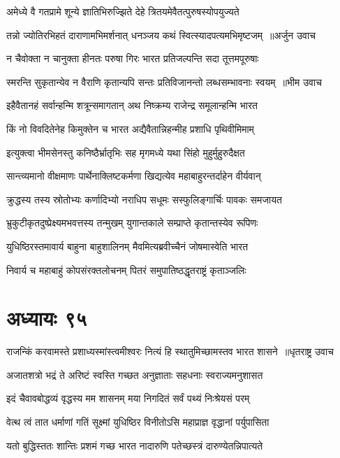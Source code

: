 \twolineshloka
{अमेध्ये वै गतप्रामे शून्ये ज्ञातिभिरुज्झिते}
{देहे त्रितयमेवैतत्पुरुषस्योपयुज्यते}


\twolineshloka
{तन्नो ज्योतिरभिहतं दाराणामभिमर्शनात्}
{धनञ्जय कथं स्वित्स्यादपत्यमभिमृष्टजम् ॥अर्जुन उवाच}


\twolineshloka
{न चैवोक्ता न चानुक्ता हीनतः परुषा गिरः}
{भारत प्रतिजल्पन्ति सदा तूत्तमपूरुषाः}


\twolineshloka
{स्मरन्ति सुकृतान्येव न वैराणि कृतान्यपि}
{सन्तः प्रतिविजानन्तो लब्धसम्भावनाः स्वयम् ॥भीम उवाच}


\twolineshloka
{इहैवैतानहं सर्वान्हन्मि शत्रून्समागतान्}
{अथ निष्क्रम्य राजेन्द्र समूलान्हन्मि भारत}


\twolineshloka
{किं नो विवदितेनेह किमुक्तेन च भारत}
{अद्यैवैतान्निहन्मीह प्रशाधि पृथिवीमिमाम्}


\twolineshloka
{इत्युक्त्वा भीमसेनस्तु कनिष्ठैर्भ्रातृभिः सह}
{मृगमध्ये यथा सिंहो मुहुर्मुहुरुदैक्षत}


\twolineshloka
{सान्त्व्यमानो वीक्षमाणः पार्थेनाक्लिष्टकर्मणा}
{खिद्यत्येव महाबाहुरन्तर्दाहेन वीर्यवान्}


\twolineshloka
{क्रुद्धस्य तस्य स्रोतोभ्यः कर्णादिभ्यो नराधिप}
{सधूमः सस्फुलिङ्गार्चिः पावकः समजायत}


\twolineshloka
{भ्रुकुटीकृतदुष्प्रेक्ष्यमभवत्तस्य तन्मुखम्}
{युगान्तकाले सम्प्राप्ते कृतान्तस्येव रूपिणः}


\twolineshloka
{युधिष्ठिरस्तमावार्य बाहुना बाहुशालिनम्}
{मैवमित्यब्रवीच्चैनं जोषमास्वेति भारत}


\twolineshloka
{निवार्य च महाबाहुं कोपसंरक्तलोचनम्}
{पितरं समुपातिष्ठद्धृतराष्ट्रं कृताञ्जलिः}


\chapter{अध्यायः ९५}
\twolineshloka
{राजन्किं करवामस्ते प्रशाध्यस्मांस्त्वमीश्वरः}
{नित्यं हि स्थातुमिच्छामस्तव भारत शासने ॥धृतराष्ट्र उवाच}


\twolineshloka
{अजातशत्रो भद्रं ते अरिष्टं स्वस्ति गच्छत}
{अनुज्ञाताः सहधनाः स्वराज्यमनुशासत}


\twolineshloka
{इदं चैवावबोद्धव्यं वृद्धस्य मम शासनम्}
{मया निगदितं सर्वं पथ्यं निःश्रेयसं परम्}


\twolineshloka
{वेत्थ त्वं तात धर्माणां गतिं सूक्ष्मां युधिष्ठिर}
{विनीतोऽसि महाप्राज्ञ वृद्धानां पर्युपासिता}


\twolineshloka
{यतो बुद्धिस्ततः शान्तिः प्रशमं गच्छ भारत}
{नादारुणि पतेच्छस्त्रं दारुण्येतन्निपात्यते}


